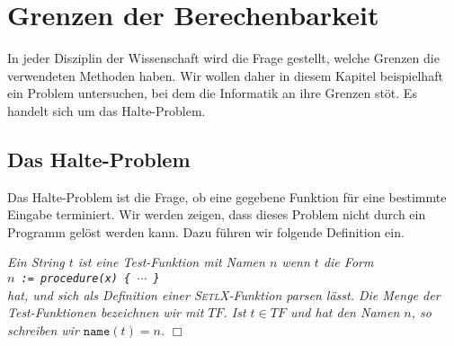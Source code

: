 \chapter{Grenzen der Berechenbarkeit}
In jeder Disziplin der Wissenschaft wird die Frage gestellt, welche Grenzen die
verwendeten Methoden haben.   Wir wollen daher in diesem Kapitel beispielhaft ein Problem
untersuchen, bei dem die Informatik an ihre Grenzen st\"o\3t.  Es handelt sich um das Halte-Problem. 

\section{Das Halte-Problem}
Das Halte-Problem ist die Frage, ob eine gegebene Funktion f\"ur eine bestimmte Eingabe
terminiert.  Wir werden zeigen, dass dieses Problem nicht durch ein Programm gel\"ost werden
kann.  Dazu f\"uhren wir folgende Definition ein.

\begin{Definition} 
{\em Ein String $t$ ist eine \emph{Test-Funktion} mit Namen $n$ wenn $t$ 
 die Form \\[0.3cm]
\hspace*{1.3cm} {\tt $n$ := procedure(x) \{ $\cdots$ \}} \\[0.3cm]
hat, und sich als Definition einer \textsc{SetlX}-Funktion parsen l\"asst.  Die Menge der
Test-Funktionen bezeichnen wir mit $T\!F$.  Ist $t \in T\!F$ und hat den Namen $n$, so
schreiben wir $\mathtt{name}(t) = n$.} \hspace*{\fill} $\Box$
\end{Definition}

